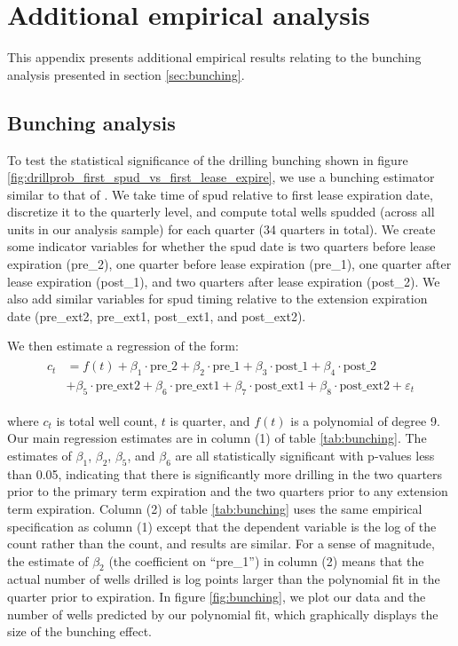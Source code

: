 \documentclass[12pt]{article}
\begin{document}
\section{Additional empirical analysis} \label{appx:more_data_analysis}

This appendix presents additional empirical results relating to the bunching analysis presented in section \ref{sec:bunching}.



\subsection{Bunching analysis} \label{appx:bunching}

To test the statistical significance of the drilling bunching shown in figure \ref{fig:drillprob_first_spud_vs_first_lease_expire}, we use a bunching estimator similar to that of \citet{bib:chetty}. We take time of spud relative to first lease expiration date, discretize it to the quarterly level, and compute total wells spudded (across all units in our analysis sample) for each quarter (34 quarters in total). We create some indicator variables for whether the spud date is two quarters before lease expiration (pre\_2), one quarter before lease expiration (pre\_1), one quarter after lease expiration (post\_1), and two quarters after lease expiration (post\_2). We also add similar variables for spud timing relative to the extension expiration date (pre\_ext2, pre\_ext1, post\_ext1, and post\_ext2).

We then estimate a regression of the form:
\begin{align}
\begin{split}
c_t & =  {f}(t) + \beta_1 \cdot \mbox{pre\_2} + \beta_2 \cdot \mbox{pre\_1} + \beta_3 \cdot \mbox{post\_1} + \beta_4 \cdot \mbox{post\_2}  \\
&  + \beta_5 \cdot \mbox{pre\_ext2} + \beta_6 \cdot \mbox{pre\_ext1} + \beta_7 \cdot \mbox{post\_ext1} + \beta_8 \cdot \mbox{post\_ext2} + \varepsilon_t
\end{split}
\label{eq:bunching}
\end{align}

\noindent where $c_t$ is total well count, $t$ is quarter, and ${f}(t)$ is a polynomial of degree 9. Our main regression estimates are in column (1) of table \ref{tab:bunching}. The estimates of $\beta_1$, $\beta_2$, $\beta_5$, and $\beta_6$ are all statistically significant with p-values less than 0.05, indicating that there is significantly more drilling in the two quarters prior to the primary term expiration and the two quarters prior to any extension term expiration. Column (2) of table \ref{tab:bunching} uses the same empirical specification as column (1) except that the dependent variable is the log of the count rather than the count, and results are similar. For a sense of magnitude, the estimate of $\beta_2$ (the coefficient on ``pre\_1'') in column (2) means that the actual number of wells drilled is log points larger than the polynomial fit in the quarter prior to expiration. In figure \ref{fig:bunching}, we plot our data and the number of wells predicted by our polynomial fit, which graphically displays the size of the bunching effect.
\end{document}
